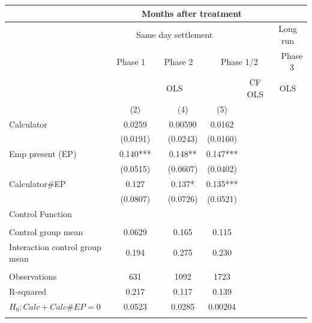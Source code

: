 \begin{tabular}{lcccccccc}
\toprule
\multicolumn{1}{|r}{} & \multicolumn{7}{c}{Months after treatment}            &  \\
\midrule
\multicolumn{1}{r|}{} & \multicolumn{5}{c}{Same day settlement} & \multicolumn{1}{c|}{} & \multicolumn{2}{c}{Long run} \\
\midrule
\midrule
\multicolumn{1}{r|}{} & \multicolumn{2}{c|}{Phase 1} & \multicolumn{2}{c|}{Phase 2} & \multicolumn{3}{c|}{Phase 1/2} & Phase 3 \\
\midrule
\multicolumn{1}{r|}{} & \multicolumn{5}{c|}{OLS}              & \multicolumn{1}{c|}{CF OLS} & \multicolumn{2}{c}{OLS} \\
\midrule
\midrule
      &       & (2)   &       & (4)   & (5)   &       &       &  \\
Calculator  &       & 0.0259 &       & 0.00590 & 0.0162 &       &       &  \\
      &       & (0.0191) &       & (0.0243) & (0.0160) &       &       &  \\
Emp present (EP) &       & 0.140*** &       & 0.148** & 0.147*** &       &       &  \\
      &       & (0.0515) &       & (0.0607) & (0.0402) &       &       &  \\
Calculator\#EP &       & 0.127 &       & 0.137* & 0.135*** &       &       &  \\
      &       & (0.0807) &       & (0.0726) & (0.0521) &       &       &  \\
Control Function &       &       &       &       &       &       &       &  \\
      &       &       &       &       &       &       &       &  \\
\midrule
Control group mean &       & 0.0629 &       & 0.165 & 0.115 &       &       &  \\
Interaction control group mean &       & 0.194 &       & 0.275 & 0.230 &       &       &  \\
\midrule
      &       &       &       &       &       &       &       &  \\
\midrule
Observations &       & 631   &       & 1092  & 1723  &       &       &  \\
R-squared &       & 0.217 &       & 0.117 & 0.139 &       &       &  \\
$H_0 : Calc + Calc\# EP = 0$ &       & 0.0523 &       & 0.0285 & 0.00204 &       &       &  \\
\midrule
\midrule
      &       &       &       &       &       &       &       &  \\
\midrule
\midrule
\end{tabular}%
